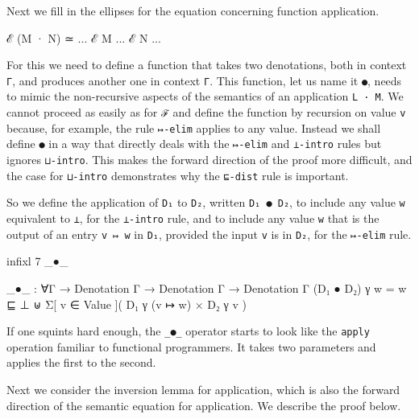 Next we fill in the ellipses for the equation concerning function
application.

\begin{myDisplay}
ℰ (M · N) ≃ ... ℰ M ... ℰ N ...
\end{myDisplay}

For this we need to define a function that takes two denotations, both
in context \texttt{Γ}, and produces another one in context \texttt{Γ}.
This function, let us name it \texttt{●}, needs to mimic the
non-recursive aspects of the semantics of an application
\texttt{L\ ·\ M}. We cannot proceed as easily as for \texttt{ℱ} and
define the function by recursion on value \texttt{v} because, for
example, the rule \texttt{↦-elim} applies to any value. Instead we shall
define \texttt{●} in a way that directly deals with the \texttt{↦-elim}
and \texttt{⊥-intro} rules but ignores \texttt{⊔-intro}. This makes the
forward direction of the proof more difficult, and the case for
\texttt{⊔-intro} demonstrates why the \texttt{⊑-dist} rule is important.

So we define the application of \texttt{D₁} to \texttt{D₂}, written
\texttt{D₁\ ●\ D₂}, to include any value \texttt{w} equivalent to
\texttt{⊥}, for the \texttt{⊥-intro} rule, and to include any value
\texttt{w} that is the output of an entry \texttt{v\ ↦\ w} in
\texttt{D₁}, provided the input \texttt{v} is in \texttt{D₂}, for the
\texttt{↦-elim} rule.

\begin{fence}
\begin{code}
infixl 7 _●_

_●_ : ∀{Γ} → Denotation Γ → Denotation Γ → Denotation Γ
(D₁ ● D₂) γ w = w ⊑ ⊥ ⊎ Σ[ v ∈ Value ]( D₁ γ (v ↦ w) × D₂ γ v )
\end{code}
\end{fence}

If one squints hard enough, the \texttt{\_●\_} operator starts to look
like the \texttt{apply} operation familiar to functional programmers. It
takes two parameters and applies the first to the second.

Next we consider the inversion lemma for application, which is also the
forward direction of the semantic equation for application. We describe
the proof below.

